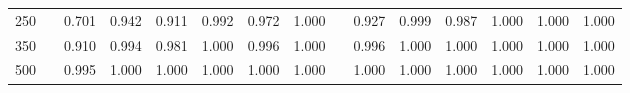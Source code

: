 % 
\begin{tabular}{ccccccccccccccc}
  \hline
  \hline
250 &  & 0.701 & 0.942 & 0.911 & 0.992 & 0.972 & 1.000 &  & 0.927 & 0.999 & 0.987 & 1.000 & 1.000 & 1.000 \\ 
  350 &  & 0.910 & 0.994 & 0.981 & 1.000 & 0.996 & 1.000 &  & 0.996 & 1.000 & 1.000 & 1.000 & 1.000 & 1.000 \\ 
  500 &  & 0.995 & 1.000 & 1.000 & 1.000 & 1.000 & 1.000 &  & 1.000 & 1.000 & 1.000 & 1.000 & 1.000 & 1.000 \\ 
   \hline
\end{tabular}
